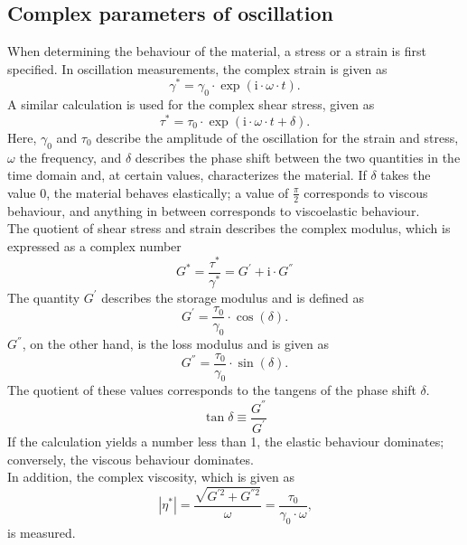 \documentclass[10pt,a4paper,ngerman]{scrartcl}
\begin{document}
	\subsection{Complex parameters of oscillation}
		When determining the behaviour of the material, a stress or a strain is first specified. In oscillation measurements, the complex strain is given as 
		\begin{equation}
			\gamma^* = \gamma_0 \cdot \exp(\text{i} \cdot \omega \cdot t) \text{.}
		\end{equation}
		A similar calculation is used for the complex shear stress, given as 
		\begin{equation}
			\tau^* = \tau_0 \cdot \exp(\text{i} \cdot \omega \cdot t + \delta) \text{.}
		\end{equation}
		Here, $\gamma_0$ and $\tau_0$ describe the amplitude of the oscillation for the strain and stress, $\omega$ the frequency, and $\delta$ 
		describes the phase shift between the two quantities in the time domain and, at certain values, characterizes the material. If $\delta$ 
		takes the value 0, the material behaves elastically; a value of $\frac{\pi}{2}$ corresponds to viscous behaviour, and anything in between 
		corresponds to viscoelastic behaviour.\\
		The quotient of shear stress and strain describes the complex modulus, which is expressed as a complex number
		\begin{equation}
			G^* = \frac{\tau^*}{\gamma^*} = G^{'} + \text{i} \cdot G^{''}
		\end{equation}
		The quantity $G^{'}$ describes the storage modulus and is defined as
		\begin{equation}
			G^{'} = \frac{\tau_0}{\gamma_0} \cdot \cos(\delta) \text{.}
		\end{equation}
		$G^{''}$, on the other hand, is the loss modulus and is given as 
		\begin{equation}
			G^{''} = \frac{\tau_0}{\gamma_0} \cdot \sin(\delta) \text{.}
		\end{equation}
		The quotient of these values corresponds to the tangens of the phase shift $\delta$.
		\begin{equation}
			\tan \delta \equiv \frac{G^{''}}{G^{'}}
		\end{equation}
		If the calculation yields a number less than 1, the elastic behaviour dominates; conversely, the viscous behaviour dominates.\\
		In addition, the complex viscosity, which is given as
		\begin{equation}
			|\eta^*| = \frac{\sqrt{G^{'2} + G^{''2}}}{\omega} = \frac{\tau_0}{\gamma_0 \cdot \omega} \text{,}
		\end{equation}
		is measured. \cite{polyskript}
\end{document}
